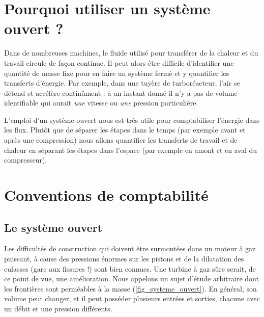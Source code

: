 \section{Pourquoi utiliser un système ouvert ?}

	Dans de nombreuses machines, le fluide utilisé pour transférer de la chaleur et du travail circule de façon continue. Il peut alors être difficile d’identifier une quantité de masse fixe pour en faire un système fermé et y quantifier les transferts d’énergie. Par exemple, dans une tuyère de turboréacteur, l’air se détend et accélère continûment : à un instant donné il n’y a pas de volume identifiable qui aurait \emph{une} vitesse ou \emph{une} pression particulière.
	
	L’emploi d’un système ouvert nous est très utile pour comptabiliser l’énergie dans les flux. Plutôt que de séparer les étapes dans le temps (par exemple avant et après une compression) nous allons quantifier les transferts de travail et de chaleur en séparant les étapes dans l’espace (par exemple en amont et en aval du compresseur).

\section{Conventions de comptabilité}
\label{ch_conventions_compta_so}

	\subsection{Le système ouvert}
	\label{ch_convention_signe_so}

			Les difficultés de construction qui doivent être surmontées dans un moteur à gaz puissant, à cause des pressions énormes sur les pistons et de la dilatation des culasses (gare aux fissures !) sont bien connues. Une turbine à gaz sûre serait, de ce point de vue, une amélioration.
		Nous appelons  un sujet d’étude arbitraire dont les frontières sont perméables à la masse (\cref{fig_systeme_ouvert}). En général, son volume peut changer, et il peut posséder plusieurs entrées et sorties, chacune avec un débit et une pression différents.

